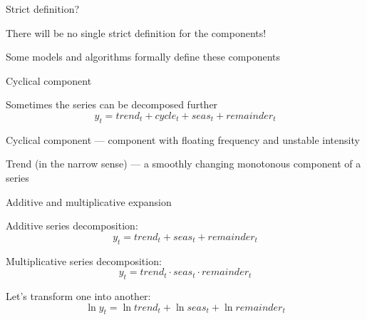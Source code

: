 \begin{frame}{Strict definition?}
	


	There will be no single strict definition for the components!
	
	\pause
	Some models and algorithms formally \alert{define} these components
	
\end{frame}

\begin{frame}{Cyclical component}
	
	Sometimes the series can be decomposed further
	\[
	y_t = trend_t + cycle_t + seas_t + remainder_t
	\]
	
	\pause
	\alert{Cyclical component} — component with floating frequency and unstable intensity
	
	
	\pause
	\alert{Trend} (in the narrow sense) — a smoothly changing monotonous component of a series
	
\end{frame}


\begin{frame}{Additive and multiplicative expansion}
	
	
	\alert{Additive} series decomposition:
	\[
	y_t = trend_t + seas_t + remainder_t
	\]
	
	\pause
	\alert{Multiplicative} series decomposition:
	\[
	y_t = trend_t \cdot seas_t \cdot remainder_t
	\]
	
	\pause
	Let's transform one into another:
	\[
	\ln y_t = \ln trend_t + \ln seas_t + \ln remainder_t
	\]
\end{frame}


